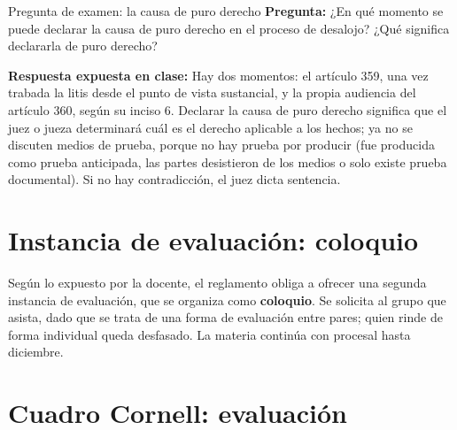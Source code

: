\documentclass[12pt,oneside]{book}
\begin{document}
\begin{exercise}{Pregunta de examen: la causa de puro derecho}
\textbf{Pregunta:} ¿En qué momento se puede declarar la causa de puro derecho en el proceso de desalojo? ¿Qué significa declararla de puro derecho?

\textbf{Respuesta expuesta en clase:} Hay dos momentos: el artículo 359, una vez trabada la litis desde el punto de vista sustancial, y la propia audiencia del artículo 360, según su inciso 6. Declarar la causa de puro derecho significa que el juez o jueza determinará cuál es el derecho aplicable a los hechos; ya no se discuten medios de prueba, porque no hay prueba por producir (fue producida como prueba anticipada, las partes desistieron de los medios o solo existe prueba documental). Si no hay contradicción, el juez dicta sentencia.
\end{exercise}

\section{Instancia de evaluación: coloquio}

Según lo expuesto por la docente, el reglamento obliga a ofrecer una segunda instancia de evaluación, que se organiza como \textbf{coloquio}. Se solicita al grupo que asista, dado que se trata de una forma de evaluación entre pares; quien rinde de forma individual queda desfasado. La materia continúa con procesal hasta diciembre.

\section{Cuadro Cornell: evaluación}
\end{document}

